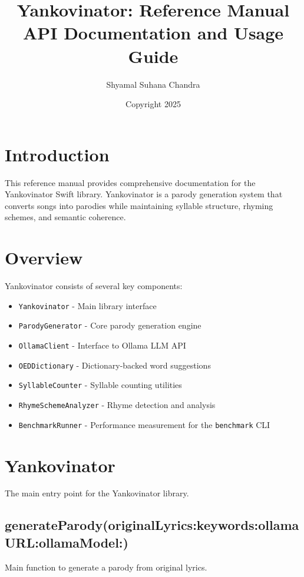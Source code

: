 \documentclass[11pt,a4paper]{article}
\title{Yankovinator: Reference Manual\\
\large API Documentation and Usage Guide}
\author{Shyamal Suhana Chandra}
\date{Copyright \textcopyright{} 2025}
\begin{document}
\maketitle

\tableofcontents
\newpage

\section{Introduction}

This reference manual provides comprehensive documentation for the Yankovinator Swift library. Yankovinator is a parody generation system that converts songs into parodies while maintaining syllable structure, rhyming schemes, and semantic coherence.

\section{Overview}

Yankovinator consists of several key components:
\begin{itemize}
    \item \texttt{Yankovinator} - Main library interface
    \item \texttt{ParodyGenerator} - Core parody generation engine
    \item \texttt{OllamaClient} - Interface to Ollama LLM API
    \item \texttt{OEDDictionary} - Dictionary-backed word suggestions
    \item \texttt{SyllableCounter} - Syllable counting utilities
    \item \texttt{RhymeSchemeAnalyzer} - Rhyme detection and analysis
    \item \texttt{BenchmarkRunner} - Performance measurement for the \texttt{benchmark} CLI
\end{itemize}

\section{Yankovinator}

The main entry point for the Yankovinator library.

\subsection{generateParody(originalLyrics:keywords:ollamaURL:ollamaModel:)}

Main function to generate a parody from original lyrics.
\end{document}
